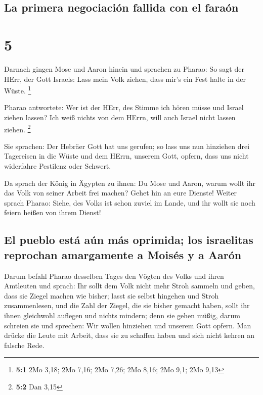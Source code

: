 \hypertarget{la-primera-negociaciuxf3n-fallida-con-el-farauxf3n}{%
\subsection{La primera negociación fallida con el
faraón}\label{la-primera-negociaciuxf3n-fallida-con-el-farauxf3n}}

\hypertarget{section-4}{%
\section{5}\label{section-4}}

 Darnach gingen Mose und Aaron hinein und sprachen zu
Pharao: So sagt der HErr, der Gott Israels: Lass mein Volk ziehen, dass
mir's ein Fest halte in der Wüste. \footnote{\textbf{5:1} 2Mo 3,18; 2Mo
  7,16; 2Mo 7,26; 2Mo 8,16; 2Mo 9,1; 2Mo 9,13}

 Pharao antwortete: Wer ist der HErr, des Stimme ich hören
müsse und Israel ziehen lassen? Ich weiß nichts von dem HErrn, will auch
Israel nicht lassen ziehen. \footnote{\textbf{5:2} Dan 3,15}

 Sie sprachen: Der Hebräer Gott hat uns gerufen; so lass
uns nun hinziehen drei Tagereisen in die Wüste und dem HErrn, unserem
Gott, opfern, dass uns nicht widerfahre Pestilenz oder Schwert.

 Da sprach der König in Ägypten zu ihnen: Du Mose und
Aaron, warum wollt ihr das Volk von seiner Arbeit frei machen? Gehet hin
an eure Dienste!  Weiter sprach Pharao: Siehe, des Volks
ist schon zuviel im Lande, und ihr wollt sie noch feiern heißen von
ihrem Dienst!

\hypertarget{el-pueblo-estuxe1-auxfan-muxe1s-oprimida-los-israelitas-reprochan-amargamente-a-moisuxe9s-y-a-aaruxf3n}{%
\subsection{El pueblo está aún más oprimida; los israelitas reprochan
amargamente a Moisés y a
Aarón}\label{el-pueblo-estuxe1-auxfan-muxe1s-oprimida-los-israelitas-reprochan-amargamente-a-moisuxe9s-y-a-aaruxf3n}}

 Darum befahl Pharao desselben Tages den Vögten des Volks
und ihren Amtleuten und sprach:  Ihr sollt dem Volk nicht
mehr Stroh sammeln und geben, dass sie Ziegel machen wie bisher; lasst
sie selbst hingehen und Stroh zusammenlesen,  und die Zahl
der Ziegel, die sie bisher gemacht haben, sollt ihr ihnen gleichwohl
auflegen und nichts mindern; denn sie gehen müßig, darum schreien sie
und sprechen: Wir wollen hinziehen und unserem Gott opfern.
 Man drücke die Leute mit Arbeit, dass sie zu schaffen
haben und sich nicht kehren an falsche Rede.

